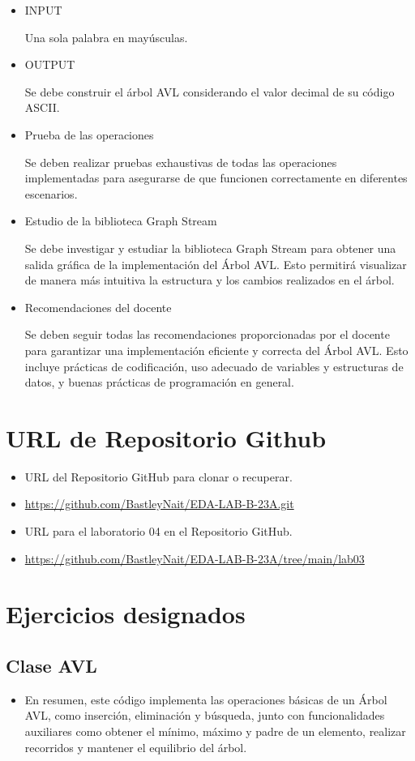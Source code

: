 \documentclass{article}
\begin{document}
\begin{itemize}
Descripción: Este método permite eliminar un elemento del Árbol AVL. También se encarga de mantener la propiedad AVL al realizar la eliminación.
Parámetros: El elemento a eliminar.
\item INPUT

Una sola palabra en mayúsculas.
\item OUTPUT

Se debe construir el árbol AVL considerando el valor decimal de su código ASCII.
\item Prueba de las operaciones

Se deben realizar pruebas exhaustivas de todas las operaciones implementadas para asegurarse de que funcionen correctamente en diferentes escenarios.
\item Estudio de la biblioteca Graph Stream

Se debe investigar y estudiar la biblioteca Graph Stream para obtener una salida gráfica de la implementación del Árbol AVL. Esto permitirá visualizar de manera más intuitiva la estructura y los cambios realizados en el árbol.
\item Recomendaciones del docente

Se deben seguir todas las recomendaciones proporcionadas por el docente para garantizar una implementación eficiente y correcta del Árbol AVL. Esto incluye prácticas de codificación, uso adecuado de variables y estructuras de datos, y buenas prácticas de programación en general.
	\end{itemize}	
		

	\section{URL de Repositorio Github}
	\begin{itemize}
		\item URL del Repositorio GitHub para clonar o recuperar.
		\item \url{https://github.com/BastleyNait/EDA-LAB-B-23A.git}
		\item URL para el laboratorio 04 en el Repositorio GitHub.
		\item \url{https://github.com/BastleyNait/EDA-LAB-B-23A/tree/main/lab03}
	\end{itemize}
	
	\section{Ejercicios designados}

	\subsection{Clase AVL}
	\begin{itemize}
		\item En resumen, este código implementa las operaciones básicas de un Árbol AVL, como inserción, eliminación y búsqueda, junto con funcionalidades auxiliares como obtener el mínimo, máximo y padre de un elemento, realizar recorridos y mantener el equilibrio del árbol.
	\end{itemize}
\end{document}
